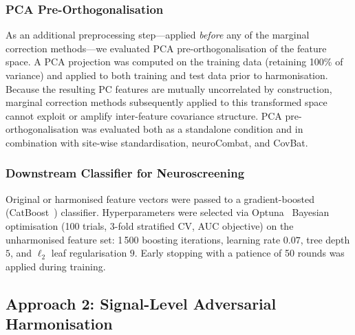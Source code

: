 \documentclass[preprint,12pt]{elsarticle}
\begin{document}
\subsubsection{PCA Pre-Orthogonalisation}
\label{subsubsec:pca}

As an additional preprocessing step---applied \emph{before} any of
the marginal correction methods---we evaluated PCA
pre-orthogonalisation of the feature space.
A PCA projection was computed on the training data (retaining 100\%
of variance) and applied to both training and test data prior to
harmonisation.
Because the resulting PC features are mutually uncorrelated by
construction, marginal correction methods subsequently applied to
this transformed space cannot exploit or amplify inter-feature
covariance structure.
PCA pre-orthogonalisation was evaluated both as a standalone
condition and in combination with site-wise standardisation,
neuroCombat, and CovBat.

\subsubsection{Downstream Classifier for Neuroscreening}
\label{subsubsec:classifier}

Original or harmonised feature vectors were passed to a
gradient-boosted (CatBoost~\cite{prokhorenkova2018catboost})
classifier.
Hyperparameters were selected via Optuna~\cite{Akiba2019}
Bayesian optimisation (100 trials, 3-fold stratified CV, AUC
objective) on the unharmonised feature set:
1\,500 boosting iterations, learning rate $0.07$, tree depth $5$,
and $\ell_2$ leaf regularisation $9$.
Early stopping with a patience of 50 rounds was applied during
training.

\subsection{Approach 2: Signal-Level Adversarial Harmonisation}
\label{sec:approach2}
\end{document}
